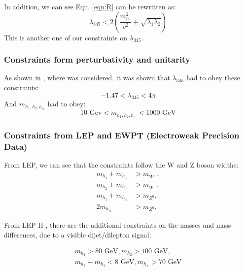 \documentclass[12pt]{article}
\begin{document}
In addition, we can see Eqn. \ref{eqn:R} can be rewritten as:
\begin{equation}
    \lambda_{345} < 2\left( \frac{m_{h_1}^2}{v^2} + \sqrt{\lambda_1\lambda_2}\right)
\end{equation}
This is another one of our constraints on $\lambda_{345}$.

\subsubsection{Constraints form perturbativity and unitarity}
As shown in \cite{Belyaev:2016lok}, where \cite{Aruhrib2012Inert} was considered, it was shown that $\lambda_{345}$ had to obey these constraints:
\begin{equation}
    -1.47 < \lambda_{345} < 4\pi
    \label{eqn:l345_pert}
\end{equation}
And $m_{h_1, h_2, h_\pm}$ had to obey:
\begin{equation}
    10\text{ Gev} < m_{h_1, h_2, h_\pm} < 1000\text{ GeV}
    \label{eqn:masses_pert}
\end{equation}

\subsubsection{Constraints from LEP and EWPT (Electroweak Precision Data)}
From LEP, we can see that the constraints follow the W and Z boson widths:
\begin{equation}
    \begin{split}
        m_{h_1} + m_{h_\pm} &> m_{W^\pm},
        \\m_{h_2} + m_{h_\pm} &> m_{W^\pm},
        \\m_{h_1} + m_{h_\pm} &> m_{Z^0},
        \\2m_{h_\pm} &> m_{Z^0}, 
    \end{split}
\label{LEP2}
\end{equation}

From LEP II \cite{Lundstr_m_2009}, there are the additional constraints on the masses and mass differences, due to a visible dijet/dilepton signal:

\begin{equation}
    \begin{split}
        m_{h_1}> 80 \text{ GeV},
        m_{h_2}> 100 \text{ GeV},
        \\
        m_{h_2} - m_{h_1} < 8\text{ GeV},
        m_{h_\pm}> 70\text{ GeV}
    \end{split}
\label{LEP2_2}
\end{equation}
\end{document}
